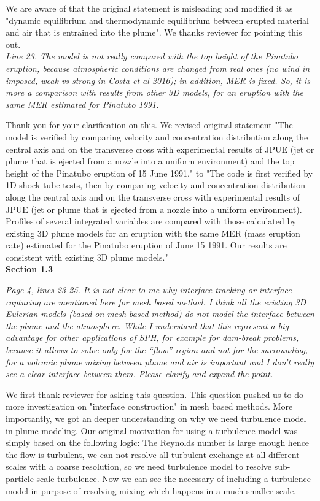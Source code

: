 \documentclass[10pt,a4paper]{article}
\begin{document}
We are aware of that the original statement is misleading and modified it as "dynamic equilibrium and thermodynamic equilibrium between erupted material and air that is entrained into the plume". We thanks reviewer for pointing this out. \\[3pt]

\textit{Line 23. The model is not really compared with the top height of the Pinatubo eruption, because atmospheric conditions are changed from real ones (no wind in imposed,
weak vs strong in Costa et al 2016); in addition, MER is fixed. So, it is more a comparison with results from other 3D models, for an eruption with the same MER estimated for Pinatubo 1991.}

Thank you for your clarification on this. We revised original statement "The model is verified by comparing velocity and concentration distribution along the central axis and on the transverse cross with experimental results of JPUE (jet or plume that is ejected from a nozzle into a uniform environment) and the top height of the Pinatubo eruption of 15 June 1991." to "The code is first verified by 1D shock tube tests, then by comparing velocity and concentration distribution along the central axis and on the transverse
cross with experimental results of JPUE (jet or plume that is ejected from a nozzle into a uniform environment). 
Profiles of several integrated variables are compared with those calculated by existing 3D plume models for an eruption with the same MER (mass eruption rate) estimated for the Pinatubo eruption of June 15 1991. Our results are consistent with existing 3D plume models." \\[6pt]

\textbf{Section 1.3}

\textit{Page 4, lines 23-25. It is not clear to me why interface tracking or interface capturing are mentioned here for mesh based method. I think all the existing 3D Eulerian models (based on mesh based method) do not model the interface between the plume and the
atmosphere. While I understand that this represent a big advantage for other applications of SPH, for example for dam-break problems, because it allows to solve only for the “flow” region and not for the surrounding, for a volcanic plume mixing between plume and air is important and I don’t really see a clear interface between them. Please clarify and expand the point.}

We first thank reviewer for asking this question. This question pushed us to do more investigation on "interface construction" in mesh based methods. More importantly, we got an deeper understanding on why we need turbulence model in plume modeling. Our original motivation for using a turbulence model was simply based on the following logic: The Reynolds number is large enough hence the flow is turbulent, we can not resolve all turbulent exchange at all different scales with a coarse resolution, so we need turbulence model to resolve sub-particle scale turbulence. Now we can see the necessary of including a turbulence model in purpose of resolving mixing which happens in a much smaller scale.
\end{document}
